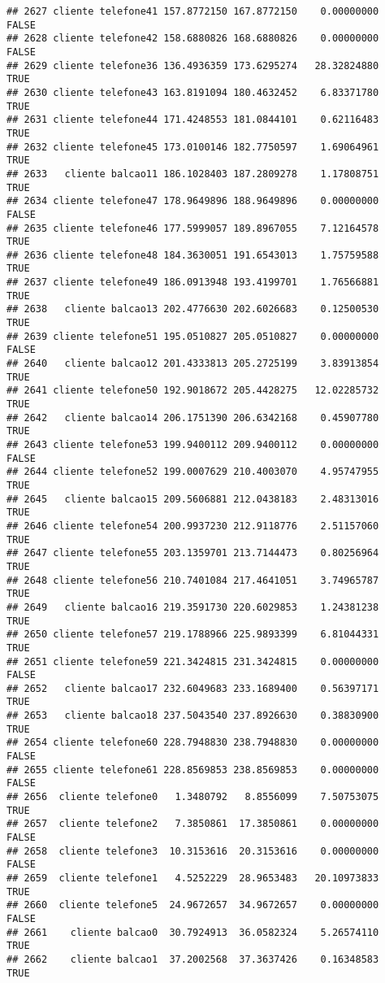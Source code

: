 \documentclass[
]{article}
\begin{document}
\begin{verbatim}
## 2627 cliente telefone41 157.8772150 167.8772150    0.00000000    FALSE
## 2628 cliente telefone42 158.6880826 168.6880826    0.00000000    FALSE
## 2629 cliente telefone36 136.4936359 173.6295274   28.32824880     TRUE
## 2630 cliente telefone43 163.8191094 180.4632452    6.83371780     TRUE
## 2631 cliente telefone44 171.4248553 181.0844101    0.62116483     TRUE
## 2632 cliente telefone45 173.0100146 182.7750597    1.69064961     TRUE
## 2633   cliente balcao11 186.1028403 187.2809278    1.17808751     TRUE
## 2634 cliente telefone47 178.9649896 188.9649896    0.00000000    FALSE
## 2635 cliente telefone46 177.5999057 189.8967055    7.12164578     TRUE
## 2636 cliente telefone48 184.3630051 191.6543013    1.75759588     TRUE
## 2637 cliente telefone49 186.0913948 193.4199701    1.76566881     TRUE
## 2638   cliente balcao13 202.4776630 202.6026683    0.12500530     TRUE
## 2639 cliente telefone51 195.0510827 205.0510827    0.00000000    FALSE
## 2640   cliente balcao12 201.4333813 205.2725199    3.83913854     TRUE
## 2641 cliente telefone50 192.9018672 205.4428275   12.02285732     TRUE
## 2642   cliente balcao14 206.1751390 206.6342168    0.45907780     TRUE
## 2643 cliente telefone53 199.9400112 209.9400112    0.00000000    FALSE
## 2644 cliente telefone52 199.0007629 210.4003070    4.95747955     TRUE
## 2645   cliente balcao15 209.5606881 212.0438183    2.48313016     TRUE
## 2646 cliente telefone54 200.9937230 212.9118776    2.51157060     TRUE
## 2647 cliente telefone55 203.1359701 213.7144473    0.80256964     TRUE
## 2648 cliente telefone56 210.7401084 217.4641051    3.74965787     TRUE
## 2649   cliente balcao16 219.3591730 220.6029853    1.24381238     TRUE
## 2650 cliente telefone57 219.1788966 225.9893399    6.81044331     TRUE
## 2651 cliente telefone59 221.3424815 231.3424815    0.00000000    FALSE
## 2652   cliente balcao17 232.6049683 233.1689400    0.56397171     TRUE
## 2653   cliente balcao18 237.5043540 237.8926630    0.38830900     TRUE
## 2654 cliente telefone60 228.7948830 238.7948830    0.00000000    FALSE
## 2655 cliente telefone61 228.8569853 238.8569853    0.00000000    FALSE
## 2656  cliente telefone0   1.3480792   8.8556099    7.50753075     TRUE
## 2657  cliente telefone2   7.3850861  17.3850861    0.00000000    FALSE
## 2658  cliente telefone3  10.3153616  20.3153616    0.00000000    FALSE
## 2659  cliente telefone1   4.5252229  28.9653483   20.10973833     TRUE
## 2660  cliente telefone5  24.9672657  34.9672657    0.00000000    FALSE
## 2661    cliente balcao0  30.7924913  36.0582324    5.26574110     TRUE
## 2662    cliente balcao1  37.2002568  37.3637426    0.16348583     TRUE

\end{verbatim}
\end{document}
